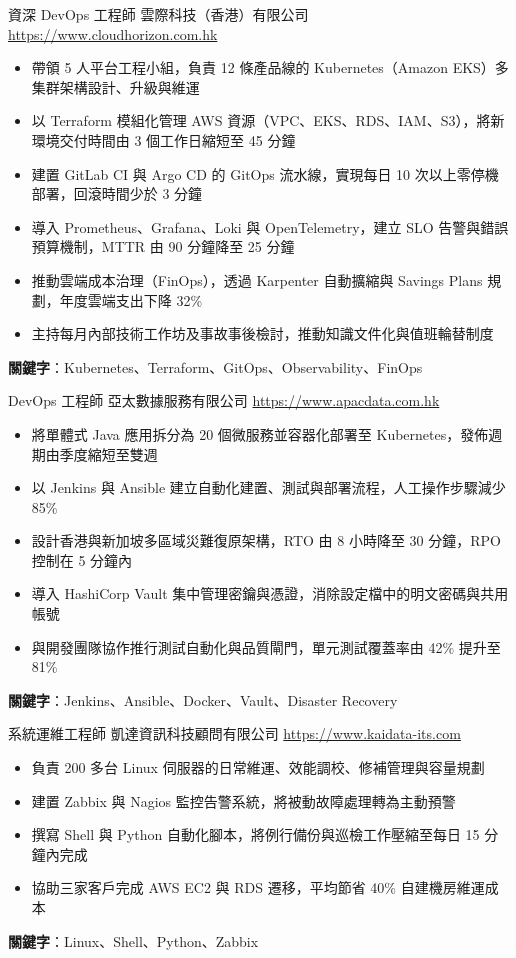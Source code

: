\documentclass[a4paper, serif, 10pt]{moderncv}
\begin{document}
        {資深 DevOps 工程師}
        {雲際科技（香港）有限公司}
        {\url{https://www.cloudhorizon.com.hk}}
        {}
        {\begin{itemize}
\item 帶領 5 人平台工程小組，負責 12 條產品線的 Kubernetes（Amazon EKS）多集群架構設計、升級與維運
\item 以 Terraform 模組化管理 AWS 資源（VPC、EKS、RDS、IAM、S3），將新環境交付時間由 3 個工作日縮短至 45 分鐘
\item 建置 GitLab CI 與 Argo CD 的 GitOps 流水線，實現每日 10 次以上零停機部署，回滾時間少於 3 分鐘
\item 導入 Prometheus、Grafana、Loki 與 OpenTelemetry，建立 SLO 告警與錯誤預算機制，MTTR 由 90 分鐘降至 25 分鐘
\item 推動雲端成本治理（FinOps），透過 Karpenter 自動擴縮與 Savings Plans 規劃，年度雲端支出下降 32\%
\item 主持每月內部技術工作坊及事故事後檢討，推動知識文件化與值班輪替制度
\end{itemize}
\textbf{關鍵字}：Kubernetes、Terraform、GitOps、Observability、FinOps}

        {DevOps 工程師}
        {亞太數據服務有限公司}
        {\url{https://www.apacdata.com.hk}}
        {}
        {\begin{itemize}
\item 將單體式 Java 應用拆分為 20 個微服務並容器化部署至 Kubernetes，發佈週期由季度縮短至雙週
\item 以 Jenkins 與 Ansible 建立自動化建置、測試與部署流程，人工操作步驟減少 85\%
\item 設計香港與新加坡多區域災難復原架構，RTO 由 8 小時降至 30 分鐘，RPO 控制在 5 分鐘內
\item 導入 HashiCorp Vault 集中管理密鑰與憑證，消除設定檔中的明文密碼與共用帳號
\item 與開發團隊協作推行測試自動化與品質閘門，單元測試覆蓋率由 42\% 提升至 81\%
\end{itemize}
\textbf{關鍵字}：Jenkins、Ansible、Docker、Vault、Disaster Recovery}

        {系統運維工程師}
        {凱達資訊科技顧問有限公司}
        {\url{https://www.kaidata-its.com}}
        {}
        {\begin{itemize}
\item 負責 200 多台 Linux 伺服器的日常維運、效能調校、修補管理與容量規劃
\item 建置 Zabbix 與 Nagios 監控告警系統，將被動故障處理轉為主動預警
\item 撰寫 Shell 與 Python 自動化腳本，將例行備份與巡檢工作壓縮至每日 15 分鐘內完成
\item 協助三家客戶完成 AWS EC2 與 RDS 遷移，平均節省 40\% 自建機房維運成本
\end{itemize}
\textbf{關鍵字}：Linux、Shell、Python、Zabbix}
\end{document}
